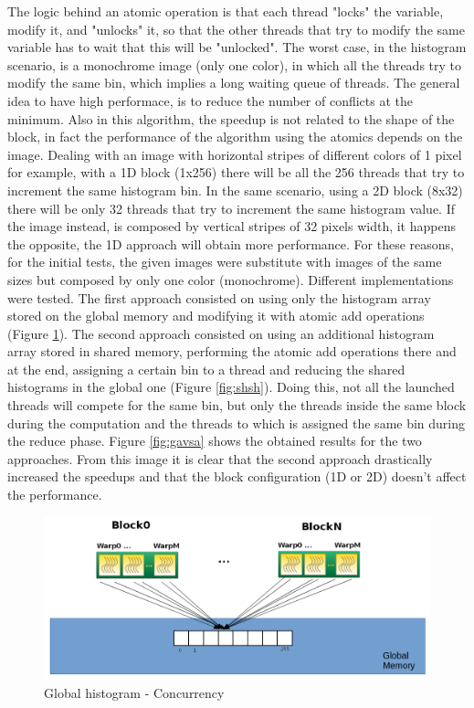 \documentclass[a4paper]{article}
\begin{document}
The logic behind an atomic operation is that each thread "locks" the variable, modify it, and "unlocks" it, so that the other threads that try to modify the same variable has to wait that this will be "unlocked". The worst case, in the histogram scenario, is a monochrome image (only one color), in which all the threads try to modify the same bin, which implies a long waiting queue of threads. The general idea to have high performace, is to reduce the number of conflicts at the minimum. Also in this algorithm, the speedup is not related to the shape of the block, in fact the performance of the algorithm using the atomics depends on the image. Dealing with an image with horizontal stripes of different colors of 1 pixel for example, with a 1D block (1x256) there will be all the 256 threads that try to increment the same histogram bin. In the same scenario, using a 2D block (8x32) there will be only 32 threads that try to increment the same histogram value. If the image instead, is composed by vertical stripes of 32 pixels width, it happens the opposite, the 1D approach will obtain more performance. For these reasons, for the initial tests, the given images were substitute with images of the same sizes but composed by only one color (monochrome). Different implementations were tested. The first approach consisted on using only the histogram array stored on the global memory and modifying it with atomic add operations (Figure \ref{fig:ghgh}). The second approach consisted on using an additional histogram array stored in shared memory, performing the atomic add operations there and at the end, assigning a certain bin to a thread and reducing the shared histograms in the global one (Figure \ref{fig:shsh}). Doing this, not all the launched threads will compete for the same bin, but only the threads inside the same block during the computation and the threads to which is assigned the same bin during the reduce phase. Figure \ref{fig:gavsa} shows the obtained results for the two approaches. From this image it is clear that the second approach drastically increased the speedups and that the block configuration (1D or 2D) doesn't affect the performance.

\begin{figure}[!ht]
    \centering
    \includegraphics[width=0.7\linewidth]{global_histo}
    \caption{Global histogram - Concurrency}
    \label{fig:ghgh}
\end{figure}
\FloatBarrier
\end{document}
